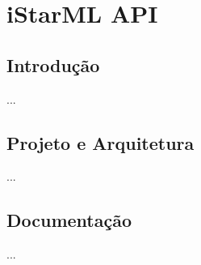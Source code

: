 \chapter{iStarML API}
\label{apendice:istarml}

\section{Introdu\c{c}\~{a}o}
...

\section{Projeto e Arquitetura}
...

\section{Documenta\c{c}\~{a}o}
...